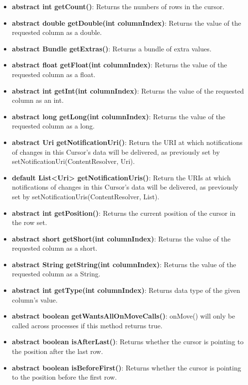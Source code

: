 \documentclass{report}
\begin{document}
\begin{itemize}
\begin{itemize}
\begin{itemize}
                \item \textbf{abstract int	getCount()}: Returns the numbers of rows in the cursor.
                \item \textbf{abstract double	getDouble(int columnIndex)}: Returns the value of the requested column as a double.
                \item \textbf{abstract Bundle	getExtras()}: Returns a bundle of extra values.
                \item \textbf{abstract float	getFloat(int columnIndex)}: Returns the value of the requested column as a float.
                \item \textbf{abstract int	getInt(int columnIndex)}: Returns the value of the requested column as an int.
                \item \textbf{abstract long	getLong(int columnIndex)}: Returns the value of the requested column as a long.
                \item \textbf{abstract Uri	getNotificationUri()}: Return the URI at which notifications of changes in this Cursor's data will be delivered, as previously set by setNotificationUri(ContentResolver, Uri).
                \item \textbf{default List<Uri>	getNotificationUris()}: Return the URIs at which notifications of changes in this Cursor's data will be delivered, as previously set by setNotificationUris(ContentResolver, List).
                \item \textbf{abstract int	getPosition()}: Returns the current position of the cursor in the row set.
                \item \textbf{abstract short	getShort(int columnIndex)}: Returns the value of the requested column as a short.
                \item \textbf{abstract String	getString(int columnIndex)}: Returns the value of the requested column as a String.
                \item \textbf{abstract int	getType(int columnIndex)}: Returns data type of the given column's value.
                \item \textbf{abstract boolean	getWantsAllOnMoveCalls()}: onMove() will only be called across processes if this method returns true.
                \item \textbf{abstract boolean	isAfterLast()}: Returns whether the cursor is pointing to the position after the last row.
                \item \textbf{abstract boolean	isBeforeFirst()}: Returns whether the cursor is pointing to the position before the first row.

\end{itemize}
\end{itemize}
\end{itemize}
\end{document}
